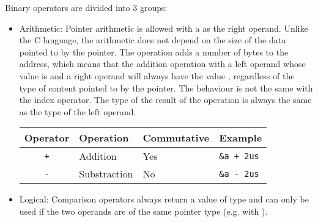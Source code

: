 Binary operators are divided into 3 groups:
\begin{itemize}
\item Arithmetic: Pointer arithmetic is allowed with a  as the
  right operand. Unlike the C language, the arithmetic does not depend on the
  size of the data pointed to by the pointer. The operation adds a number of
  bytes to the address, which means that the addition operation with a left
  operand whose value is  and a right operand  will
  always have the value , regardless of the type of content
  pointed to by the pointer. The behaviour is not the same with the index
  operator. The type of the result of the operation is always the same as the
  type of the left operand.

  \begin{center}\begin{adjustbox}{max width=1\linewidth}
    \begin{tabular}{|c|lll|}
      \hline
      Operator & Operation & Commutative & Example \\
      \hline
      \hline
      \texttt{+} & Addition & Yes & \texttt{\&a + 2us} \\
      \texttt{-} & Substraction & No & \texttt{\&a - 2us} \\
      \hline
    \end{tabular}
  \end{adjustbox}\end{center}

\item Logical: Comparison operators always return a value of type 
  and can only be used if the two operands are of the same pointer type (e.g.
   with ).


\end{itemize}
